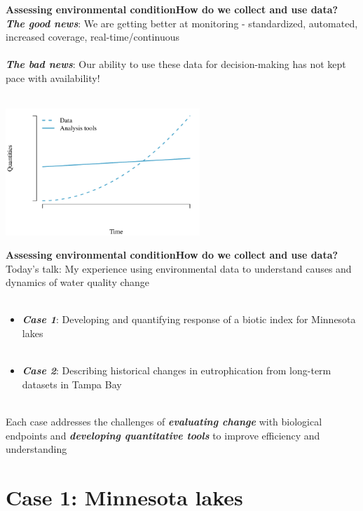\documentclass[serif]{beamer}\usepackage[]{graphicx}\usepackage[]{color}
\newcommand{\emtxt}[1]{\textbf{\textit{#1}}}
\begin{document}
\begin{frame}{\textbf{Assessing environmental condition}}{\textbf{How do we collect and use data?}}
\onslide<+->
\emtxt{The good news}: We are getting better at monitoring - standardized, automated, increased coverage, real-time/continuous \\~\\
\emtxt{The bad news}: Our ability to use these data for decision-making has not kept pace with availability! \\~\\
\onslide<+->


{\centering \includegraphics[width=0.55\textwidth]{fig/theo-1} 

}



\end{frame}

\begin{frame}{\textbf{Assessing environmental condition}}{\textbf{How do we collect and use data?}}
\onslide<+->
Today's talk: My experience using environmental data to understand causes and dynamics of water quality change\\~\\
\begin{itemize}
\item \emtxt{Case 1}: Developing and quantifying response of a biotic index for Minnesota lakes \\~\\
\item \emtxt{Case 2}: Describing historical changes in eutrophication from long-term datasets in Tampa Bay \\~\\
\end{itemize}
\onslide<+->
Each case addresses the challenges of \emtxt{evaluating change} with biological endpoints and \emtxt{developing quantitative tools} to improve efficiency and understanding
\end{frame}

\section{Case 1: Minnesota lakes}
\end{document}
